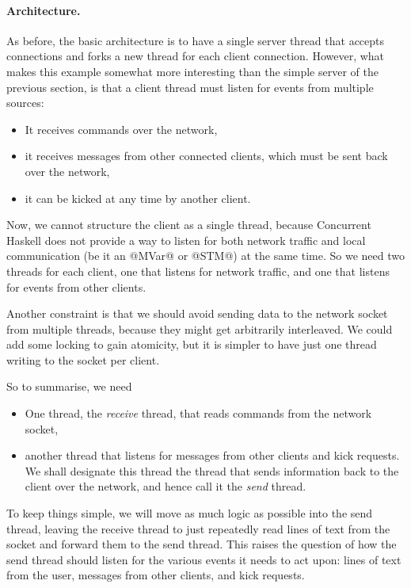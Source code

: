 \paragraph{Architecture.}  As before, the basic architecture is to have a single server thread
that accepts connections and forks a new thread for each client
connection.  However, what makes this example somewhat more
interesting than the simple server of the previous section, is that a
client thread must listen for events from multiple sources:

\begin{itemize}
\item It receives commands over the network,
\item it receives messages from other connected clients,
  which must be sent back over the network,
\item it can be kicked at any time by another client.
\end{itemize}

Now, we cannot structure the client as a single thread, because
Concurrent Haskell does not provide a way to listen for both network
traffic and local communication (be it an @MVar@ or @STM@) at the same
time.  So we need two threads for each client, one that listens for
network traffic, and one that listens for events from other clients.

Another constraint is that we should avoid sending data to the network
socket from multiple threads, because they might get arbitrarily
interleaved.  We could add some locking to gain atomicity, but it is
simpler to have just one thread writing to the socket per client.

So to summarise, we need

\begin{itemize}
\item One thread, the \emph{receive} thread, that reads commands from
  the network socket,
\item another thread that listens for messages from other clients and
  kick requests.  We shall designate this thread the thread that sends
  information back to the client over the network, and hence call it
  the \emph{send} thread.
\end{itemize}

To keep things simple, we will move as much logic as possible into the
send thread, leaving the receive thread to just repeatedly read lines
of text from the socket and forward them to the send thread.  This
raises the question of how the send thread should listen for the
various events it needs to act upon: lines of text from the user,
messages from other clients, and kick requests.


